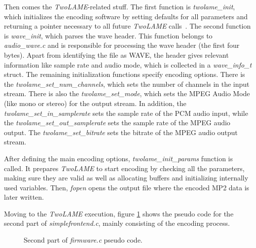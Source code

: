 Then comes the \textit{TwoLAME}-related stuff. The first function is \textit{twolame\_init}, which initializes the encoding software by setting defaults for all parameters and returning a pointer necessary to all future \textit{TwoLAME} calls~\cite{twolameapi}. The second function is \textit{wave\_init}, which parses the wave header. This function belongs to \textit{audio\_wave.c} and is responsible for processing the wave header (the first four bytes). Apart from identifying the file as WAVE, the header gives relevant information like sample rate and audio mode, which is collected in a \textit{wave\_info\_t} struct.
The remaining initialization functions specify encoding options. There is the \textit{twolame\_set\_num\_channels}, which sets the number of channels in the input stream. There is also the \textit{twolame\_set\_mode}, which sets the MPEG Audio Mode (like mono or stereo) for the output stream. In addition, the \textit{twolame\_set\_in\_samplerate} sets the sample rate of the PCM audio input, while the \textit{twolame\_set\_out\_samplerate} sets the sample rate of the MPEG audio output. The \textit{twolame\_set\_bitrate} sets the bitrate of the MPEG audio output stream.

After defining the main encoding options, \textit{twolame\_init\_params} function is called. It prepares \textit{TwoLAME} to start encoding by checking all the parameters, making sure they are valid as well as allocating buffers and initializing internally used variables. Then, \textit{fopen} opens the output file where the encoded MP2 data is later written.

Moving to the \textit{TwoLAME} execution, figure \ref{pseudo2} shows the pseudo code for the second part of \textit{simplefrontend.c}, mainly consisting of the encoding process.

\begin{figure}[H]
\centerline{}
\caption{Second part of \textit{firmware.c} pseudo code.}
\label{pseudo2}
\end{figure}


